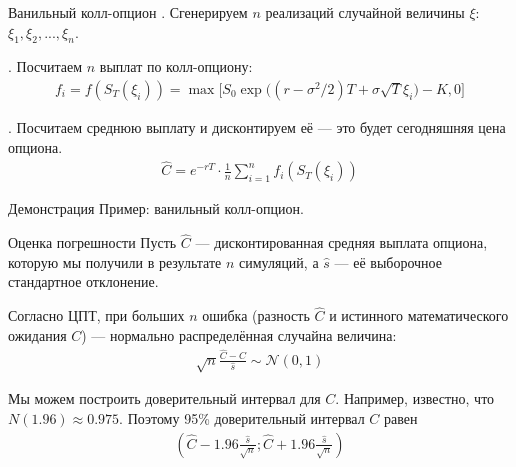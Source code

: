 \documentclass{beamer}
\begin{document}
\begin{frame}{Ванильный колл-опцион}
. Сгенерируем $n$ реализаций случайной величины $\xi$: $\xi_1, \xi_2, ..., \xi_n$. 

. Посчитаем $n$ выплат по колл-опциону:
\begin{align*}
f_i = f(S_T(\xi_i)) = \max\Big[S_0 \exp\Big((r - \sigma^2/2)T + \sigma\sqrt{T}\xi_i\Big) - K, 0\Big]
\end{align*}

. Посчитаем среднюю выплату и дисконтируем её --- это будет сегодняшняя цена опциона.
\begin{align*}
\hat{C} = e^{-rT} \cdot \frac{1}{n}\sum\limits_{i=1}^{n}f_i(S_T(\xi_i))
\end{align*}
\end{frame}



\begin{frame}{Демонстрация}
\justify
Пример: ванильный колл-опцион.
\end{frame}



\begin{frame}{Оценка погрешности}
\justify
Пусть $\hat{C}$ --- дисконтированная средняя выплата 	опциона, которую мы получили в результате $n$ симуляций, а $\hat{s}$ --- её выборочное стандартное отклонение.

\justify
Согласно ЦПТ, при больших $n$ ошибка (разность $\hat{C}$ и истинного математического ожидания $C$) --- нормально распределённая случайна величина:
\begin{align*}
\sqrt{n}\frac{\hat{C} - C}{\hat{s}} \sim \mathcal{N}(0, 1)
\end{align*}

\justify
Мы можем построить доверительный интервал для $C$. Например, известно, что $N(1.96) \approx 0.975$. Поэтому 95\% доверительный интервал $C$ равен
\begin{align*}
\left(\hat{C} - 1.96\frac{\hat{s}}{\sqrt{n}}; \hat{C} + 1.96\frac{\hat{s}}{\sqrt{n}} \right)
\end{align*}  
\end{frame}
\end{document}
